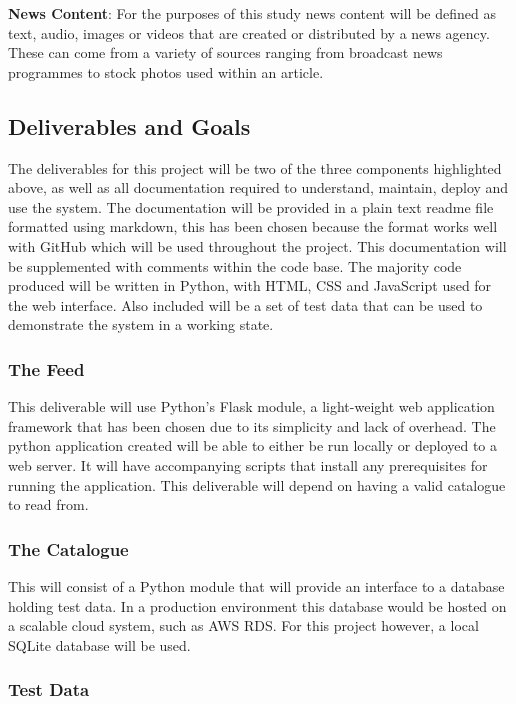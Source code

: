 \documentclass[12pt,titlepage]{article}
\begin{document}
  \textbf{News Content}: For the purposes of this study news content will be
  defined as text, audio, images or videos that are created or distributed by a
  news agency. These can come from a variety of sources ranging from broadcast
  news programmes to stock photos used within an article.

  \subsection{Deliverables and Goals}

  The deliverables for this project will be two of the three components
  highlighted above, as well as all documentation required to understand,
  maintain, deploy and use the system. The documentation will be provided in a
  plain text readme file formatted using markdown, this has been chosen because
  the format works well with GitHub which will be used throughout the project.
  This documentation will be supplemented with comments within the code base. The
  majority code produced will be written in Python, with HTML, CSS and
  JavaScript used for the web interface. Also included will be a set of test
  data that can be used to demonstrate the system in a working state.

    \subsubsection{The Feed}

    This deliverable will use Python's Flask module, a light-weight web
    application framework that has been chosen due to its simplicity and lack of
    overhead. The python application created will be able to either be run
    locally or deployed to a web server. It will have accompanying scripts that
    install any prerequisites for running the application. This deliverable will
    depend on having a valid catalogue to read from.

    \subsubsection{The Catalogue}

    This will consist of a Python module that will provide an interface to a
    database holding test data. In a production environment this database would
    be hosted on a scalable cloud system, such as AWS RDS. For this project
    however, a local SQLite database will be used.

    \subsubsection{Test Data}
\end{document}

